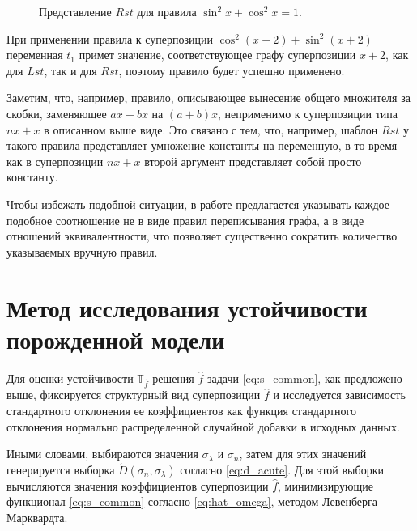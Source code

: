 \documentclass[12pt,a4paper]{article}
\begin{document}
\begin{figure}[h]
  \centering
  \caption{Представление $Rst$ для правила $\sin^2 x + \cos^2 x = 1$.}
  \label{fig:rst_example}
\end{figure}

При применении правила к суперпозиции $\cos^2 (x + 2) + \sin^2 (x + 2)$ переменная
$t_1$ примет значение, соответствующее графу суперпозиции $x + 2$, как для $Lst$,
так и для $Rst$, поэтому правило будет успешно применено.

Заметим, что, например, правило, описывающее вынесение общего множителя за
скобки, заменяющее $ax + bx$ на $(a + b)x$, неприменимо к суперпозиции типа
$nx + x$ в описанном выше виде. Это связано с тем, что, например, шаблон $Rst$
у такого правила представляет умножение константы на переменную, в то время
как в суперпозиции $nx + x$ второй аргумент представляет собой просто константу.

Чтобы избежать подобной ситуации, в работе предлагается указывать каждое
подобное соотношение не в виде правил переписывания графа, а в виде отношений
эквивалентности, что позволяет существенно сократить количество указываемых вручную
правил.

\section{Метод исследования устойчивости порожденной модели}

Для оценки устойчивости $\mathbb{T}_{\hat{f}}$ решения $\hat{f}$ задачи
\eqref{eq:s_common}, как предложено выше, фиксируется структурный вид суперпозиции
$\hat{f}$ и исследуется зависимость стандартного отклонения ее коэффициентов
как функция стандартного отклонения нормально распределенной случайной добавки
в исходных данных.

Иными словами, выбираются значения $\sigma_{\lambda}$ и $\sigma_n$, затем для этих
значений генерируется выборка $\acute{D}(\sigma_n, \sigma_{\lambda})$ согласно
\eqref{eq:d_acute}. Для этой выборки вычисляются значения коэффициентов суперпозиции
$\hat{f}$, минимизирующие функционал \eqref{eq:s_common} согласно \eqref{eq:hat_omega},
методом Левенберга-Марквардта.
\end{document}
